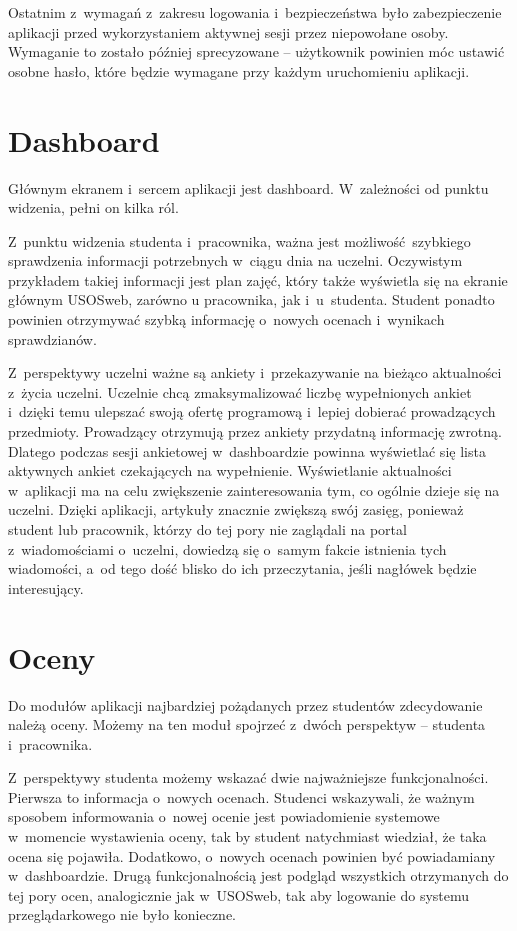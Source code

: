 \documentclass{pracamgr}
\begin{document}
Ostatnim z~wymagań z~zakresu logowania i~bezpieczeństwa było zabezpieczenie aplikacji
przed wykorzystaniem aktywnej sesji przez niepowołane osoby. Wymaganie to zostało później
sprecyzowane -- użytkownik powinien móc ustawić osobne hasło, które będzie wymagane 
przy każdym uruchomieniu aplikacji.

\section{Dashboard}

Głównym ekranem i~sercem aplikacji jest dashboard. W~zależności od punktu widzenia, pełni
on kilka ról.

Z~punktu widzenia studenta i~pracownika, ważna jest możliwość szybkiego sprawdzenia informacji
potrzebnych w~ciągu dnia na uczelni. Oczywistym przykładem takiej informacji jest plan zajęć,
który także wyświetla się na ekranie głównym USOSweb, zarówno u pracownika, jak i~u~studenta.
Student ponadto powinien otrzymywać szybką informację o~nowych ocenach i~wynikach sprawdzianów.

Z~perspektywy uczelni ważne są ankiety i~przekazywanie na bieżąco aktualności z~życia
uczelni. Uczelnie chcą zmaksymalizować liczbę
wypełnionych ankiet i~dzięki temu ulepszać swoją ofertę programową i~lepiej dobierać
prowadzących przedmioty. Prowadzący otrzymują przez ankiety przydatną informację zwrotną.
Dlatego podczas sesji ankietowej w~dashboardzie powinna wyświetlać się lista aktywnych
ankiet czekających na wypełnienie. Wyświetlanie aktualności w~aplikacji ma na
celu zwiększenie zainteresowania tym,
co ogólnie dzieje się na uczelni. Dzięki aplikacji, artykuły znacznie zwiększą swój zasięg,
ponieważ student lub pracownik, którzy do tej pory nie zaglądali na portal z~wiadomościami
o~uczelni, dowiedzą się o~samym fakcie istnienia tych wiadomości, a~od tego dość blisko do
ich przeczytania, jeśli nagłówek będzie interesujący.

\section{Oceny}

Do modułów aplikacji najbardziej pożądanych przez studentów zdecydowanie należą oceny.
Możemy na ten moduł spojrzeć z~dwóch perspektyw -- studenta i~pracownika.

Z~perspektywy studenta możemy wskazać dwie najważniejsze funkcjonalności. Pierwsza to
informacja o~nowych ocenach. Studenci wskazywali, że ważnym sposobem informowania o~nowej
ocenie jest powiadomienie systemowe w~momencie wystawienia oceny, tak by student natychmiast
wiedział, że taka ocena się pojawiła. Dodatkowo, o~nowych ocenach powinien być powiadamiany
w~dashboardzie. Drugą funkcjonalnością jest podgląd wszystkich otrzymanych do tej pory ocen,
analogicznie jak w~USOSweb, tak aby logowanie do systemu przeglądarkowego nie było konieczne.
\end{document}
